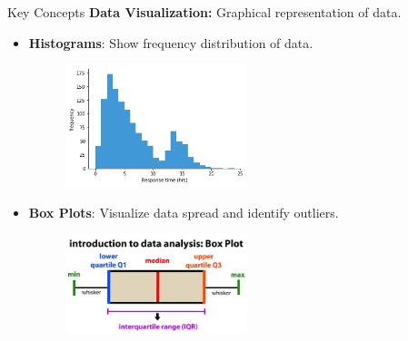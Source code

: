 \documentclass{beamer}
\begin{document}
\begin{frame}{Key Concepts}
\textbf{Data Visualization:} Graphical representation of data.
\begin{itemize}
    \item \textbf{Histograms}: Show frequency distribution of data.
        \begin{figure}
            \centering
            \includegraphics[width=0.5\textwidth]{imgs/histogram.png}
        \end{figure}
    \item \textbf{Box Plots}: Visualize data spread and identify outliers.
        \begin{figure}
            \centering
            \includegraphics[width=0.5\textwidth]{imgs/box-plot.png}
        \end{figure}
    \end{itemize}
\end{frame}
\end{document}

